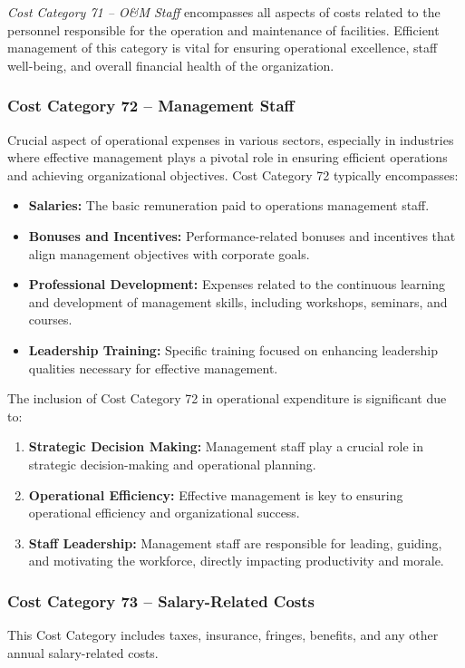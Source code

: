 \textit{Cost Category 71 – O\&M Staff} encompasses all aspects of costs related to the personnel responsible for the operation and maintenance of facilities. Efficient management of this category is vital for ensuring operational excellence, staff well-being, and overall financial health of the organization.


\subsubsection*{Cost Category 72 – Management Staff}
Crucial aspect of operational expenses in various sectors, especially in industries where effective management plays a pivotal role in ensuring efficient operations and achieving organizational objectives.  Cost Category 72 typically encompasses:

\begin{itemize}
    \item \textbf{Salaries:} The basic remuneration paid to operations management staff.
    \item \textbf{Bonuses and Incentives:} Performance-related bonuses and incentives that align management objectives with corporate goals.
    \item \textbf{Professional Development:} Expenses related to the continuous learning and development of management skills, including workshops, seminars, and courses.
    \item \textbf{Leadership Training:} Specific training focused on enhancing leadership qualities necessary for effective management.
\end{itemize}

The inclusion of Cost Category 72 in operational expenditure is significant due to:

\begin{enumerate}
    \item \textbf{Strategic Decision Making:} Management staff play a crucial role in strategic decision-making and operational planning.
    \item \textbf{Operational Efficiency:} Effective management is key to ensuring operational efficiency and organizational success.
    \item \textbf{Staff Leadership:} Management staff are responsible for leading, guiding, and motivating the workforce, directly impacting productivity and morale.
\end{enumerate}


\subsubsection*{Cost Category 73 – Salary-Related Costs}
This Cost Category includes taxes, insurance, fringes, benefits, and any other annual salary-related costs.

